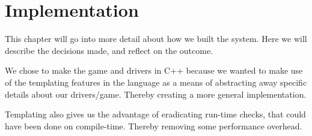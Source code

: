 \chapter{Implementation}\label{cha:implementation}

This chapter will go into more detail about how we built the system. Here we will describe the decisions made, and reflect on the outcome.

We chose to make the game and drivers in C++ because we wanted to make use of the templating features in the language as a means of abstracting away specific details about our drivers/game. Thereby creating a more general implementation. 

Templating also gives us the advantage of eradicating run-time checks, that could have been done on compile-time. Thereby removing some performance overhead.




